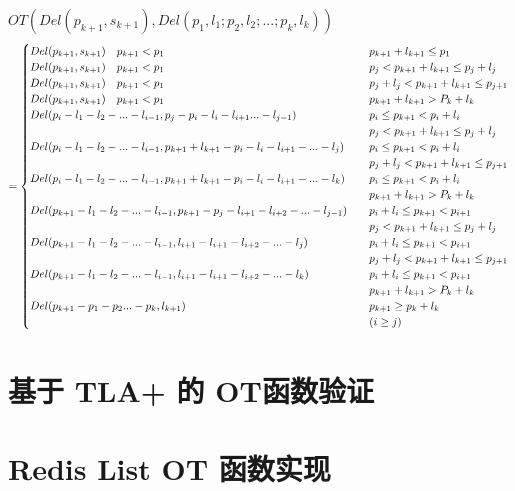 \documentclass[a4paper,UTF8]{article}
\begin{document}
$OT(Del(p_{k+1},s_{k+1}),Del(p_1,l_1;p_2,l_2;...;p_k,l_k))$\\
\begin{equation}
= \begin{cases}
Del(p_{k+1},s_{k+1}) \quad p_{k+1} < p_1 \quad &p_{k+1}+l_{k+1} \le p_1 \\
Del(p_{k+1},s_{k+1}) \quad p_{k+1} < p_1 \quad &p_j < p_{k+1}+l_{k+1} \le p_j+l_j \\
Del(p_{k+1},s_{k+1}) \quad p_{k+1} < p_1 \quad &p_j+l_j < p_{k+1}+l_{k+1} \le p_{j+1} \\
Del(p_{k+1},s_{k+1}) \quad p_{k+1} < p_1 \quad &p_{k+1}+l_{k+1} > P_k+l_k  \\

Del(p_i-l_1-l_2-...-l_{i-1},p_j-p_i-l_i-l_{i+1}...-l_{j-1})        \quad &p_i \le p_{k+1} < p_i+l_i \quad \\ &p_j < p_{k+1}+l_{k+1} \le p_j+l_j \\
Del(p_i-l_1-l_2-...-l_{i-1},p_{k+1}+l_{k+1}-p_i-l_i-l_{i+1}-...-l_j) \quad &p_i \le p_{k+1} < p_i+l_i \quad \\& p_j+l_j < p_{k+1}+l_{k+1} \le p_{j+1} \\
Del(p_i-l_1-l_2-...-l_{i-1},p_{k+1}+l_{k+1}-p_i-l_i-l_{i+1}-...-l_k) \quad &p_i \le p_{k+1} < p_i+l_i \quad \\& p_{k+1}+l_{k+1} > P_k+l_k  \\


Del(p_{k+1}-l_1-l_2-...-l_{i-1},p_{k+1}-p_j-l_{i+1}-l_{i+2}-...-l_{j-1})    \quad &p_i+l_i \le p_{k+1} < p_{i+1} \quad \\& p_j < p_{k+1}+l_{k+1} \le p_j+l_j \\
Del(p_{k+1}-l_1-l_2-...-l_{i-1},l_{i+1}-l_{i+1}-l_{i+2}-...-l_j)    \quad &p_i+l_i \le p_{k+1} < p_{i+1} \quad \\& p_j+l_j < p_{k+1}+l_{k+1} \le p_{j+1} \\
Del(p_{k+1}-l_1-l_2-...-l_{i-1},l_{i+1}-l_{i+1}-l_{i+2}-...-l_k)    \quad &p_i+l_i \le p_{k+1} < p_{i+1} \quad \\& p_{k+1}+l_{k+1} > P_k+l_k  \\

Del(p_{k+1}-p_1-p_2...-p_k,l_{k+1}) \quad &p_{k+1} \ge p_k+l_k
\\&(i \ge j)

 \end{cases}\\
\end{equation}

\section{基于 TLA+ 的 OT函数验证} 



\section{Redis List OT 函数实现} 
\end{document}
